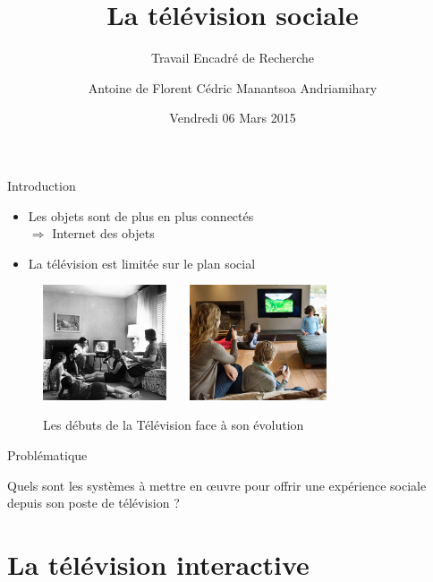 \documentclass{beamer}
\title[] %
{La télévision sociale}
\subtitle{Travail Encadré de Recherche}
\author[
\textbf{F}lorent\\
\textbf{A}ntoine\\
\textbf{C}édric\\
Manan\textbf{T}soa
] %
{Antoine de \bsc{Roquemaurel}\newline Florent \bsc{Berbie}\newline Cédric \bsc{Rohaut}\newline Manantsoa Andriamihary \bsc{Razanajatovo}}
\institute[] %
{
  Universit\'e Toulouse III -- Paul Sabatier \\
  M1 Informatique -- Développement Logiciel 
  \vspace{-10px}
}
\date[ ~ ~ ~ 05 / 03 / 2015] %
{Vendredi 06 Mars 2015}
\begin{document}
	\begin{frame}
		\titlepage
	\end{frame}
	\begin{frame}{Introduction}
	\begin{itemize}
		\item Les objets sont de plus en plus connectés\\
			$\Rightarrow$ Internet des objets
		\pause
		\vfill
		\item La télévision est limitée sur le plan social
	\end{itemize}
		\vfill
			\begin{figure}[H]
				\centering
				\includegraphics[height=3.4cm]{images/intro/old.jpg}~~~
				\includegraphics[height=3.4cm]{images/intro/currently.jpg}
				\caption{Les débuts de la Télévision face à son évolution}
			\end{figure}
		\end{frame}
	\begin{frame}{Problématique}
		\Large
		\begin{center}
		Quels sont les systèmes à mettre en œuvre pour offrir une expérience sociale depuis son poste de télévision ?
	\end{center}
	\end{frame}
	\begin{frame}
		\tableofcontents
	\end{frame}
	\section{La télévision interactive}
\end{document}
